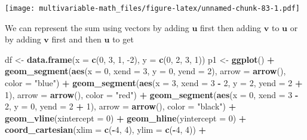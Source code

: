 \documentclass[
]{book}
\newenvironment{Shaded}{\begin{snugshade}}{\end{snugshade}}
\newcommand{\DataTypeTok}[1]{\textcolor[rgb]{0.13,0.29,0.53}{#1}}
\newcommand{\DecValTok}[1]{\textcolor[rgb]{0.00,0.00,0.81}{#1}}
\newcommand{\KeywordTok}[1]{\textcolor[rgb]{0.13,0.29,0.53}{\textbf{#1}}}
\newcommand{\NormalTok}[1]{#1}
\newcommand{\OperatorTok}[1]{\textcolor[rgb]{0.81,0.36,0.00}{\textbf{#1}}}
\newcommand{\StringTok}[1]{\textcolor[rgb]{0.31,0.60,0.02}{#1}}
\theoremstyle{definition}
\theoremstyle{definition}
\theoremstyle{definition}
\theoremstyle{remark}
\begin{document}
\texttt{[image: multivariable-math\_files/figure-latex/unnamed-chunk-83-1.pdf]}

We can represent the sum using vectors by adding \(\mathbf{u}\) first then adding \(\mathbf{v}\) to \(\mathbf{u}\) or by adding \(\mathbf{v}\) first and then \(\mathbf{u}\) to get

\begin{Shaded}
\begin{Highlighting}[]
\NormalTok{df <-}\StringTok{ }\KeywordTok{data.frame}\NormalTok{(}\DataTypeTok{x =} \KeywordTok{c}\NormalTok{(}\DecValTok{0}\NormalTok{, }\DecValTok{3}\NormalTok{, }\DecValTok{1}\NormalTok{, }\DecValTok{-2}\NormalTok{), }\DataTypeTok{y =} \KeywordTok{c}\NormalTok{(}\DecValTok{0}\NormalTok{, }\DecValTok{2}\NormalTok{, }\DecValTok{3}\NormalTok{, }\DecValTok{1}\NormalTok{))}
\NormalTok{p1 <-}\StringTok{ }\KeywordTok{ggplot}\NormalTok{() }\OperatorTok{+}
\StringTok{    }\KeywordTok{geom_segment}\NormalTok{(}\KeywordTok{aes}\NormalTok{(}\DataTypeTok{x =} \DecValTok{0}\NormalTok{, }\DataTypeTok{xend =} \DecValTok{3}\NormalTok{, }\DataTypeTok{y =} \DecValTok{0}\NormalTok{, }\DataTypeTok{yend =} \DecValTok{2}\NormalTok{), }\DataTypeTok{arrow =} \KeywordTok{arrow}\NormalTok{(), }\DataTypeTok{color =} \StringTok{"blue"}\NormalTok{) }\OperatorTok{+}
\StringTok{    }\KeywordTok{geom_segment}\NormalTok{(}\KeywordTok{aes}\NormalTok{(}\DataTypeTok{x =} \DecValTok{3}\NormalTok{, }\DataTypeTok{xend =} \DecValTok{3} \OperatorTok{-}\StringTok{ }\DecValTok{2}\NormalTok{, }\DataTypeTok{y =} \DecValTok{2}\NormalTok{, }\DataTypeTok{yend =} \DecValTok{2} \OperatorTok{+}\StringTok{ }\DecValTok{1}\NormalTok{), }\DataTypeTok{arrow =} \KeywordTok{arrow}\NormalTok{(), }\DataTypeTok{color =} \StringTok{"red"}\NormalTok{) }\OperatorTok{+}
\StringTok{    }\KeywordTok{geom_segment}\NormalTok{(}\KeywordTok{aes}\NormalTok{(}\DataTypeTok{x =} \DecValTok{0}\NormalTok{, }\DataTypeTok{xend =} \DecValTok{3} \OperatorTok{-}\StringTok{ }\DecValTok{2}\NormalTok{, }\DataTypeTok{y =} \DecValTok{0}\NormalTok{, }\DataTypeTok{yend =} \DecValTok{2} \OperatorTok{+}\StringTok{ }\DecValTok{1}\NormalTok{), }\DataTypeTok{arrow =} \KeywordTok{arrow}\NormalTok{(), }\DataTypeTok{color =} \StringTok{"black"}\NormalTok{) }\OperatorTok{+}
\StringTok{    }\KeywordTok{geom_vline}\NormalTok{(}\DataTypeTok{xintercept =} \DecValTok{0}\NormalTok{) }\OperatorTok{+}\StringTok{ }
\StringTok{    }\KeywordTok{geom_hline}\NormalTok{(}\DataTypeTok{yintercept =} \DecValTok{0}\NormalTok{) }\OperatorTok{+}
\StringTok{    }\KeywordTok{coord_cartesian}\NormalTok{(}\DataTypeTok{xlim =} \KeywordTok{c}\NormalTok{(}\OperatorTok{-}\DecValTok{4}\NormalTok{, }\DecValTok{4}\NormalTok{), }\DataTypeTok{ylim =} \KeywordTok{c}\NormalTok{(}\OperatorTok{-}\DecValTok{4}\NormalTok{, }\DecValTok{4}\NormalTok{)) }\OperatorTok{+}\StringTok{ }

\end{Highlighting}
\end{Shaded}
\end{document}
